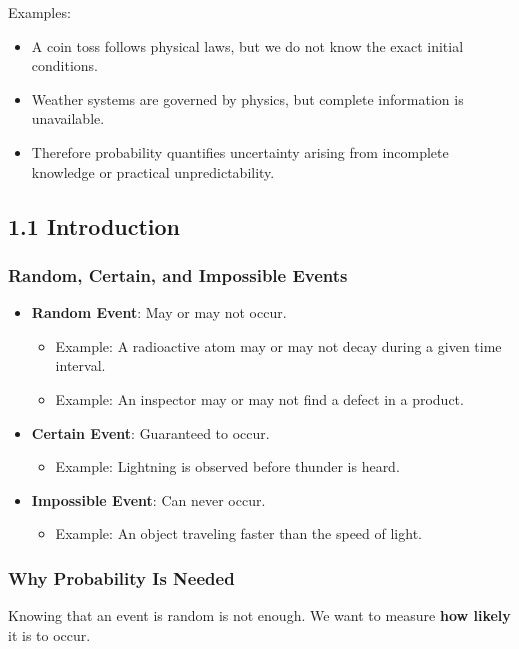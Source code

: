 \documentclass[11pt]{article}
\begin{document}
Examples:
\begin{itemize}
\item A coin toss follows physical laws, but we do not know the exact initial conditions.
\item Weather systems are governed by physics, but complete information is unavailable.
\item Therefore probability quantifies uncertainty arising from incomplete knowledge or practical unpredictability.
\end{itemize}
\subsection{1.1 Introduction}
\label{sec:orgf558ab6}

\subsubsection{Random, Certain, and Impossible Events}
\label{sec:org2249ee1}

\begin{itemize}
\item \textbf{Random Event}: May or may not occur.
\begin{itemize}
\item Example: A radioactive atom may or may not decay during a given time interval.
\item Example: An inspector may or may not find a defect in a product.
\end{itemize}

\item \textbf{Certain Event}: Guaranteed to occur.
\begin{itemize}
\item Example: Lightning is observed before thunder is heard.
\end{itemize}

\item \textbf{Impossible Event}: Can never occur.
\begin{itemize}
\item Example: An object traveling faster than the speed of light.
\end{itemize}
\end{itemize}
\subsubsection{Why Probability Is Needed}
\label{sec:org543cf23}

Knowing that an event is random is not enough. We want to measure \textbf{how likely} it is to occur.
\end{document}
